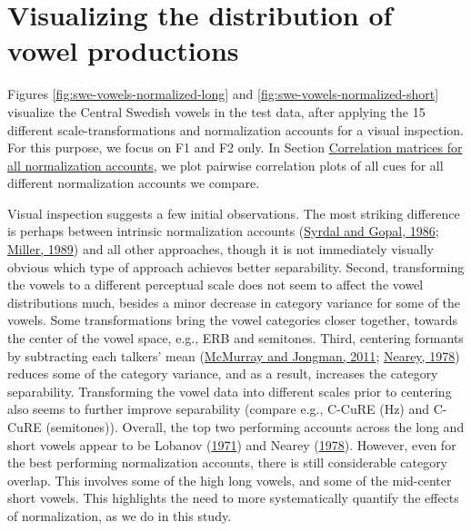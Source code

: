 \documentclass[utf8]{frontiers_suppmat} %
\begin{document}
\hypertarget{sec:normVowelSpace}{%
\section{Visualizing the distribution of vowel productions}\label{sec:normVowelSpace}}

Figures \ref{fig:swe-vowels-normalized-long} and \ref{fig:swe-vowels-normalized-short} visualize the Central Swedish vowels in the test data, after applying the 15 different scale-transformations and normalization accounts for a visual inspection. For this purpose, we focus on F1 and F2 only. In Section \protect\hyperlink{sec:correlation-matrices}{Correlation matrices for all normalization accounts}, we plot pairwise correlation plots of all cues for all different normalization accounts we compare.

Visual inspection suggests a few initial observations. The most striking difference is perhaps between intrinsic normalization accounts (\protect\hyperlink{ref-Syrdal1986}{Syrdal and Gopal, 1986}; \protect\hyperlink{ref-miller1989c}{Miller, 1989}) and all other approaches, though it is not immediately visually obvious which type of approach achieves better separability. Second, transforming the vowels to a different perceptual scale does not seem to affect the vowel distributions much, besides a minor decrease in category variance for some of the vowels. Some transformations bring the vowel categories closer together, towards the center of the vowel space, e.g., ERB and semitones. Third, centering formants by subtracting each talkers' mean (\protect\hyperlink{ref-mcmurray-jongman2011}{McMurray and Jongman, 2011}; \protect\hyperlink{ref-nearey1978}{Nearey, 1978}) reduces some of the category variance, and as a result, increases the category separability. Transforming the vowel data into different scales prior to centering also seems to further improve separability (compare e.g., C-CuRE (Hz) and C-CuRE (semitones)). Overall, the top two performing accounts across the long and short vowels appear to be Lobanov (\protect\hyperlink{ref-lobanov1971}{1971}) and Nearey (\protect\hyperlink{ref-nearey1978}{1978}). However, even for the best performing normalization accounts, there is still considerable category overlap. This involves some of the high long vowels, and some of the mid-center short vowels. This highlights the need to more systematically quantify the effects of normalization, as we do in this study.
\end{document}
